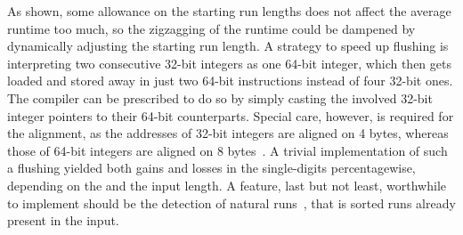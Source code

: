 As shown, some allowance on the starting run lengths does not affect the average runtime too much, so the zigzagging of the runtime could be dampened by dynamically adjusting the starting run length.
A strategy to speed up flushing is interpreting two consecutive 32-bit integers as one 64-bit integer, which then gets loaded and stored away in just two 64-bit instructions instead of four 32-bit ones.
The compiler can be prescribed to do so by simply casting the involved 32-bit integer pointers to their 64-bit counterparts.
Special care, however, is required for the alignment, as the addresses of 32-bit integers are aligned on 4 bytes, whereas those of 64-bit integers are aligned on 8 bytes~\cite[DPU ABI -- Data types]{upmemSDK}.
A trivial implementation of such a flushing yielded both gains and losses in the single-digits percentagewise, depending on the \MS{} and the input length.
A feature, last but not least, worthwhile to implement should be the detection of natural runs~\cites[Chapter~2.6]{lang2009algorithmen}[Chapter~2.3.2]{wirth1975algorithmen}, that is sorted runs already present in the input.


